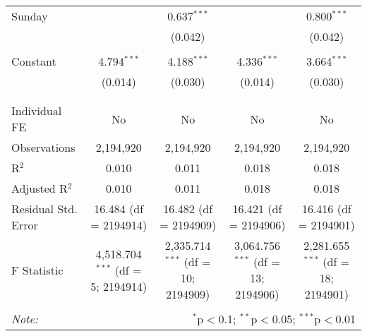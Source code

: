 \documentclass[
]{article}
\begin{document}
\begin{table}[!htbp]
{\begin{tabular}{@{\extracolsep{5pt}}lcccc}
 Sunday &  & 0.637$^{***}$ &  & 0.800$^{***}$ \\ 
  &  & (0.042) &  & (0.042) \\ 
  & & & & \\ 
 Constant & 4.794$^{***}$ & 4.188$^{***}$ & 4.336$^{***}$ & 3.664$^{***}$ \\ 
  & (0.014) & (0.030) & (0.014) & (0.030) \\ 
  & & & & \\ 
\hline \\[-1.8ex] 
Individual FE & No & No & No & No \\ 
Observations & 2,194,920 & 2,194,920 & 2,194,920 & 2,194,920 \\ 
R$^{2}$ & 0.010 & 0.011 & 0.018 & 0.018 \\ 
Adjusted R$^{2}$ & 0.010 & 0.011 & 0.018 & 0.018 \\ 
Residual Std. Error & 16.484 (df = 2194914) & 16.482 (df = 2194909) & 16.421 (df = 2194906) & 16.416 (df = 2194901) \\ 
F Statistic & 4,518.704$^{***}$ (df = 5; 2194914) & 2,335.714$^{***}$ (df = 10; 2194909) & 3,064.756$^{***}$ (df = 13; 2194906) & 2,281.655$^{***}$ (df = 18; 2194901) \\ 
\hline 
\hline \\[-1.8ex] 
\textit{Note:}  & \multicolumn{4}{r}{$^{*}$p$<$0.1; $^{**}$p$<$0.05; $^{***}$p$<$0.01} \\ 
\end{tabular}
} 
\end{table} 
\newpage
\end{document}
